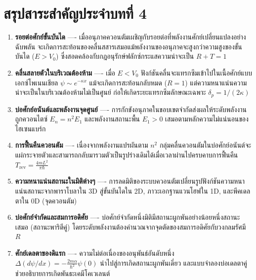 \section{สรุปสาระสำคัญประจำบทที่ 4}
\label{sec_chapter_summary_ch04}

\begin{enumerate}
    \item \textbf{รอยต่อศักย์ขั้นบันได} ---- เมื่ออนุภาคควอนตัมเผชิญกับรอยต่อที่พลังงานศักย์เปลี่ยนแปลงอย่างฉับพลัน จะเกิดการสะท้อนของคลื่นสสารเสมอแม้พลังงานของอนุภาคจะสูงกว่าความสูงของขั้นบันได ($E > V_0$) ซึ่งสอดคล้องกับกฎอนุรักษ์ฟลักซ์กระแสความน่าจะเป็น $R + T = 1$
    
    \item \textbf{คลื่นสลายตัวในบริเวณต้องห้าม} ---- เมื่อ $E < V_0$ ฟังก์ชันคลื่นจะแทรกซึมเข้าไปในเนื้อศักย์แบบเอกซ์โพเนนเชียล $\psi \sim e^{-\kappa x}$ แม้จะเกิดการสะท้อนกลับหมด ($R=1$) แต่ความหนาแน่นความน่าจะเป็นในบริเวณต้องห้ามไม่เป็นศูนย์ ก่อให้เกิดระยะแทรกซึมลักษณะเฉพาะ $\delta_p = 1/(2\kappa)$
    
    \item \textbf{บ่อศักย์อนันต์และพลังงานจุดศูนย์} ---- การกักขังอนุภาคในขอบเขตจำกัดส่งผลให้ระดับพลังงานถูกควอนไตซ์ $E_n = n^2 E_1$ และพลังงานสถานะพื้น $E_1 > 0$ เสมอตามหลักความไม่แน่นอนของไฮเซนแบร์ก
    
    \item \textbf{การฟื้นคืนควอนตัม} ---- เนื่องจากพลังงานแปรผันตาม $n^2$ กลุ่มคลื่นควอนตัมในบ่อศักย์อนันต์จะแผ่กระจายตัวและสามารถกลับมารวมตัวเป็นรูปร่างเดิมได้เมื่อเวลาผ่านไปครบคาบการฟื้นคืน $T_{\text{rev}} = \frac{4mL^2}{\pi\hbar}$
    
    \item \textbf{ความหนาแน่นสถานะในมิติต่างๆ} ---- การลดมิติของระบบควอนตัมเปลี่ยนรูปฟังก์ชันความหนาแน่นสถานะจากพาราโบลาใน 3D สู่ขั้นบันไดใน 2D, ภาวะเอกฐานแวนโฮฟใน 1D, และพีคเดลตาใน 0D (จุดควอนตัม)
    
    \item \textbf{บ่อศักย์จำกัดและสมการอดิศัย} ---- บ่อศักย์จำกัดหนึ่งมิติมีสถานะผูกพันอย่างน้อยหนึ่งสถานะเสมอ (สถานะพาริตีคู่) โดยระดับพลังงานต้องคำนวณจากจุดตัดของสมการอดิศัยกับวงกลมรัศมี $R$
    
    \item \textbf{ศักย์เดลตาของดิแรก} ---- ความไม่ต่อเนื่องของอนุพันธ์อันดับหนึ่ง $\Delta(d\psi/dx) = -\frac{2m\alpha}{\hbar^2}\psi(0)$ นำไปสู่การเกิดสถานะผูกพันเดี่ยว และแบบจำลองบ่อเดลตาคู่ช่วยอธิบายการเกิดพันธะเคมีโคเวเลนต์
    

\end{enumerate}
